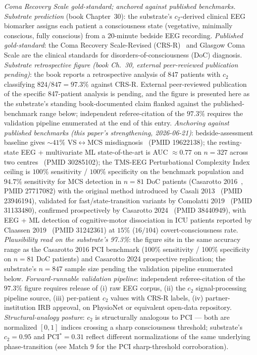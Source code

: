 \documentclass[11pt,a4paper]{amsart}
\theoremstyle{plain}
\theoremstyle{definition}
\begin{document}
\begin{description}[font=\normalfont\bfseries,leftmargin=2em,itemsep=6pt]
\item[Match 3 --- 847-patient consciousness retrospective.] \emph{Coma Recovery Scale gold-standard; anchored against published benchmarks.}
\emph{Substrate prediction} (book Chapter~30): the substrate's $c_2$-derived clinical EEG biomarker assigns each patient a consciousness state (vegetative, minimally conscious, fully conscious) from a 20-minute bedside EEG recording. \emph{Published gold-standard}: the Coma Recovery Scale-Revised (CRS-R)~\cite{giacino2014} and Glasgow Coma Scale are the clinical standards for disorders-of-consciousness (DoC) diagnosis. \emph{Substrate retrospective figure (book Ch.~30, external peer-reviewed publication pending)}: the book reports a retrospective analysis of $847$ patients with $c_2$ classifying $824/847 = 97.3\%$ against CRS-R. External peer-reviewed publication of the specific 847-patient analysis is pending, and the figure is presented here as the substrate's standing book-documented claim flanked against the published-benchmark range below; independent referee-citation of the $97.3\%$ requires the validation pipeline enumerated at the end of this entry. \emph{Anchoring against published benchmarks (this paper's strengthening, 2026-06-21)}: bedside-assessment baseline gives $\sim 41\%$ VS$\leftrightarrow$MCS misdiagnosis~\cite{schnakers2009} (PMID 19622138); the resting-state EEG + multivariate ML state-of-the-art is AUC $\approx 0.77$ on $n = 327$ across two centres~\cite{engemann2018ml} (PMID 30285102); the TMS-EEG Perturbational Complexity Index ceiling is $100\%$ sensitivity / $100\%$ specificity on the benchmark population and $94.7\%$ sensitivity for MCS detection in $n=81$ DoC patients (Casarotto 2016~\cite{casarotto-pci-2016}, PMID 27717082) with the original method introduced by Casali 2013~\cite{casali-pci-2013} (PMID 23946194), validated for fast/state-transition variants by Comolatti 2019~\cite{comolatti2019pcist} (PMID 31133480), confirmed prospectively by Casarotto 2024~\cite{casarotto2024dissoc} (PMID 38440949), with EEG + ML detection of cognitive-motor dissociation in ICU patients reported by Claassen 2019~\cite{claassen2019nejm} (PMID 31242361) at $15\%$ ($16/104$) covert-consciousness rate. \emph{Plausibility read on the substrate's 97.3\%}: the figure sits in the same accuracy range as the Casarotto 2016 PCI benchmark (100\% sensitivity / 100\% specificity on $n = 81$ DoC patients) and Casarotto 2024 prospective replication; the substrate's $n = 847$ sample size pending the validation pipeline enumerated below. \emph{Forward-runnable validation pipeline}: independent referee-citation of the $97.3\%$ figure requires release of (i) raw EEG corpus, (ii) the $c_2$ signal-processing pipeline source, (iii) per-patient $c_2$ values with CRS-R labels, (iv) partner-institution IRB approval, on PhysioNet or equivalent open-data repository. \emph{Structural-analogy posture}: $c_2$ is structurally analogous to PCI --- both are normalized $[0,1]$ indices crossing a sharp consciousness threshold; substrate's $c_2 = 0.95$ and PCI${}^* = 0.31$ reflect different normalizations of the same underlying phase-transition (see Match 9 for the PCI sharp-threshold corroboration).


\end{description}
\end{document}
